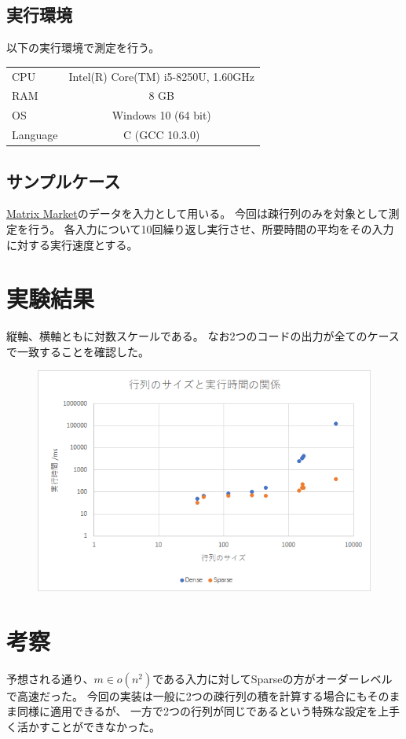 \documentclass[uplatex, dvipdfmx]{jsarticle}
\theoremstyle{case}
\begin{document}
  \subsection{実行環境}
  以下の実行環境で測定を行う。
  \begin{table}[h]
    \centering
    \begin{tabular}{l|c}
      CPU & Intel(R) Core(TM) i5-8250U, 1.60GHz \\
      RAM & 8 GB\\
      OS & Windows 10 (64 bit)\\
      Language & C (GCC 10.3.0)\\
    \end{tabular}
  \end{table}

  \subsection{サンプルケース}
  \href{https://math.nist.gov/MatrixMarket/matrices.html}{Matrix Market}のデータを入力として用いる。
  今回は疎行列のみを対象として測定を行う。
  各入力について10回繰り返し実行させ、所要時間の平均をその入力に対する実行速度とする。

  \newpage
  \section{実験結果}
  縦軸、横軸ともに対数スケールである。
  なお2つのコードの出力が全てのケースで一致することを確認した。

  \begin{figure}[h]
    \centering
    \includegraphics[scale=1.2]{fig.png}
  \end{figure}

  \section{考察}
  予想される通り、$m\in o(n^2)$である入力に対してSparseの方がオーダーレベルで高速だった。
  今回の実装は一般に2つの疎行列の積を計算する場合にもそのまま同様に適用できるが、
  一方で2つの行列が同じであるという特殊な設定を上手く活かすことができなかった。
\end{document}
